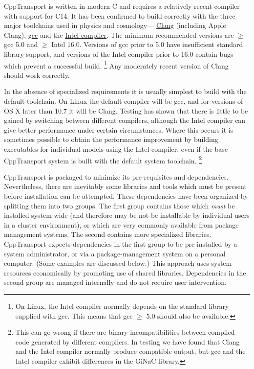 \documentclass[11pt,a4paper]{article}
\newcommand{\packagefont}{\sffamily}
\newcommand{\GiNaC}{{\packagefont GiNaC}}
\newcommand{\CppTransport}{{\packagefont CppTransport}}
\newcommand{\semibold}[1]{{\fontseries{b}\selectfont{#1}}}
\newcommand{\para}[1]{\par\vspace{2mm}\noindent\semibold{{#1.}---}\ignorespaces}
\newcommand\CC{C\nolinebreak\hspace{-.05em}\raisebox{.4ex}{\relsize{-3}{\textbf{+}}}\nolinebreak\hspace{-.10em}\raisebox{.4ex}{\relsize{-3}{\textbf{+}}}}
\renewcommand{\geq}{\geqslant}
\begin{document}
\para{Compiler}
{\CppTransport} is written in modern {\CC} and requires a relatively recent compiler
with support for {\CC}14.
It has been confirmed to build
correctly with the three major toolchains used in physics and cosmology---%
\href{http://clang.llvm.org}{Clang}
(including Apple Clang),
\href{https://gcc.gnu.org}{gcc} and the
\href{https://software.intel.com/en-us/c-compilers}{Intel compiler}.
The minimum recommended versions
are $\geq$ gcc 5.0
and $\geq$ Intel 16.0.
Versions of gcc prior to 5.0 have insufficient standard library support,
and versions of the Intel compiler prior to 16.0
contain bugs which prevent a successful build.%
    \footnote{On Linux, the Intel compiler normally depends on the
    standard library supplied with gcc.
    This means that gcc $\geq$ 5.0 should also be available.}
Any moderately recent version of Clang should work correctly.

In the absence of specialized requirements
it is usually simplest to build with the default
toolchain.
On Linux the default compiler
will be gcc, and for versions of OS X later than 10.7
it will be Clang.
Testing has shown that there is little to be gained by switching between
different compilers, although the Intel compiler can give better performance
under certain circumstances.
Where this occurs
it is sometimes possible to obtain the performance improvement
by building executables for individual models using the Intel compiler,
even if the base {\CppTransport} system is built with the default system
toolchain.%
    \footnote{This can go wrong if there are binary incompatibilities
    between compiled code generated by different compilers.
    In testing we have found that Clang and the Intel compiler normally
    produce compatible output, but gcc and the Intel compiler
    exhibit differences in the {\GiNaC} library.}

\para{Dependencies}
{\CppTransport} is packaged to minimize its pre-requisites and
dependencies.
Nevertheless, there are inevitably some libraries and tools which must be present
before installation can be attempted.
These dependencies have been organized by splitting them into two groups.
The
first
group contains those which \emph{must} be installed system-wide
(and therefore may be not be installable by individual users in a cluster environment),
or which are very commonly available from package management systems.
The second contains more specialized libraries.
{\CppTransport}
expects dependencies in the first group to be pre-installed by a system
administrator,
or via a package-management system on a personal computer. (Some examples are discussed
below.)
This approach uses system resources economically by
promoting use of shared libraries. 
Dependencies in the second group are managed internally
and
do not require user intervention.
\end{document}
